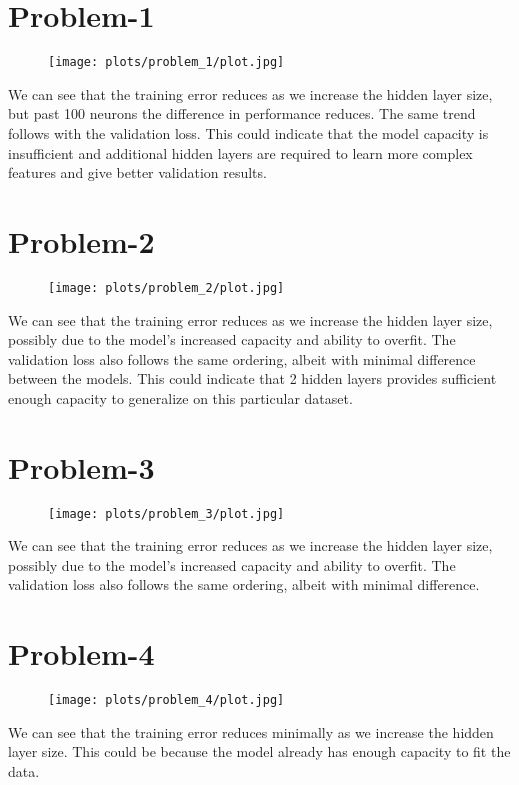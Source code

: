 \documentclass[addpoints,12pt]{exam}
\begin{document}
\section*{Problem-1}
\begin{figure}[h]
\texttt{[image: plots/problem\_1/plot.jpg]}
\centering
\end{figure}
We can see that the training error reduces as we increase the hidden layer size, but past 100 neurons the difference in performance reduces. The same trend follows with the validation loss. This could indicate that the model capacity is insufficient and additional hidden layers are required to learn more complex features and give better validation results.
\newpage

\section*{Problem-2}
\begin{figure}[h]
\texttt{[image: plots/problem\_2/plot.jpg]}
\centering
\end{figure}
We can see that the training error reduces as we increase the hidden layer size, possibly due to the model's increased capacity and ability to overfit. The validation loss also follows the same ordering, albeit with minimal difference between the models. This could indicate that 2 hidden layers provides sufficient enough capacity to generalize on this particular dataset.
\newpage

\section*{Problem-3}
\begin{figure}[h]
\texttt{[image: plots/problem\_3/plot.jpg]}
\centering
\end{figure}
We can see that the training error reduces as we increase the hidden layer size, possibly due to the model's increased capacity and ability to overfit. The validation loss also follows the same ordering, albeit with minimal difference.
\newpage

\section*{Problem-4}
\begin{figure}[h]
\texttt{[image: plots/problem\_4/plot.jpg]}
\centering
\end{figure}
We can see that the training error reduces minimally as we increase the hidden layer size. This could be because the model already has enough capacity to fit the data.
\newpage
\end{document}
